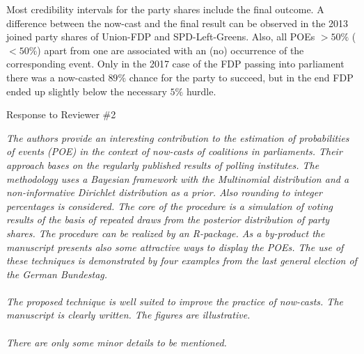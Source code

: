 \documentclass{scrartcl}
\begin{document}
Most credibility intervals for the party shares include the final outcome. A difference between the now-cast and the final result can be observed in the 2013 joined party shares of Union-FDP and SPD-Left-Greens. Also, all POEs $>50\%$ ($<50\%$) apart from one are associated with an (no) occurrence of the corresponding event. Only in the 2017 case of the FDP passing into parliament there was a now-casted $89\%$ chance for the party to succeed, but in the end FDP ended up slightly below the necessary $5\%$ hurdle.


\pagebreak
\begin{center}
\large Response to Reviewer \#2
\end{center}
\vspace{5ex}

\emph{
The authors provide an interesting contribution to the estimation of probabilities of events (POE) in the context of now-casts of coalitions in parliaments. Their approach bases on the regularly published results of polling institutes. The methodology uses a Bayesian framework with the Multinomial distribution and a non-informative Dirichlet distribution as a prior. Also rounding to integer percentages is considered. The core of the procedure is a simulation of voting results of the basis of repeated draws from the posterior distribution of party shares. The procedure can be realized by an R-package. As a by-product the manuscript presents also some attractive ways to display the POEs. The use of these techniques is demonstrated by four examples from the last general election of the German Bundestag.
\\ \\
The proposed technique is well suited to improve the practice of now-casts. The manuscript is clearly written. The figures are illustrative.
\\ \\
There are only some minor details to be mentioned.
}
\end{document}
